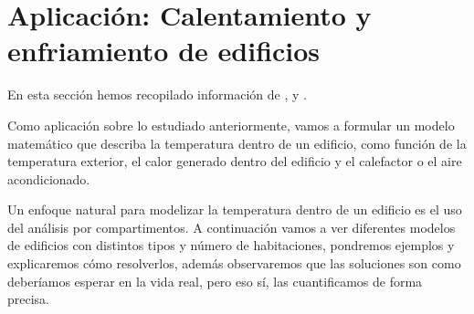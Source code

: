 \chapter{Aplicación: Calentamiento y enfriamiento de edificios}
En esta sección hemos recopilado información de \cite{Campos}, \cite{Nagle} y \cite{tfm}.

Como aplicación sobre lo estudiado anteriormente, vamos a formular un modelo matemático que describa la temperatura dentro de un edificio, como función de la temperatura exterior, el calor generado dentro del edificio y el calefactor o el aire acondicionado.

Un enfoque natural para modelizar la temperatura dentro de un edificio es el uso del análisis por compartimentos. A continuación vamos a ver diferentes modelos de edificios con distintos tipos y número de habitaciones, pondremos ejemplos y explicaremos cómo resolverlos, además observaremos que las soluciones son como deberíamos esperar en la vida real, pero eso sí, las cuantificamos de forma precisa.
